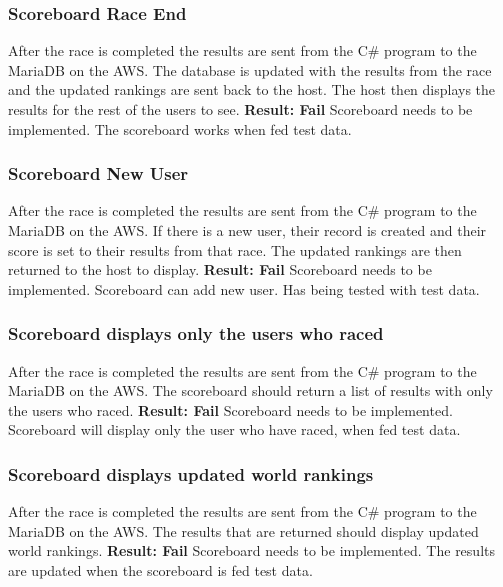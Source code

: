 \subsubsection{Scoreboard Race End}\newline
After the race is completed the results are sent from the C\# program to the MariaDB on the AWS. The database is updated with the results from the race and the updated rankings are sent back to the host. The host then displays the results for the rest of the users to see.\newline 
\textbf{Result: Fail} Scoreboard needs to be implemented. The scoreboard works when fed test data. 

\subsubsection{Scoreboard New User}\newline
After the race is completed the results are sent from the C\# program to the MariaDB on the AWS. If there is a new user, their record is created and their score is set to their results from that race. The updated rankings are then returned to the host to display.\newline
\textbf{Result: Fail} Scoreboard needs to be implemented. Scoreboard can add new user. Has being tested with test data. 

\subsubsection{Scoreboard displays only the users who raced}\newline
After the race is completed the results are sent from the C\# program to the MariaDB on the AWS. The scoreboard should return a list of results with only the users who raced.\newline
\textbf{Result: Fail} Scoreboard needs to be implemented. Scoreboard will display only the user who have raced, when fed test data.\newline

\subsubsection{Scoreboard displays updated world rankings}\newline
After the race is completed the results are sent from the C# program to the MariaDB on the AWS. The results that are returned should display updated world rankings. \newline
\textbf{Result: Fail} Scoreboard needs to be implemented. The results are updated when the scoreboard is fed test data. \newline

